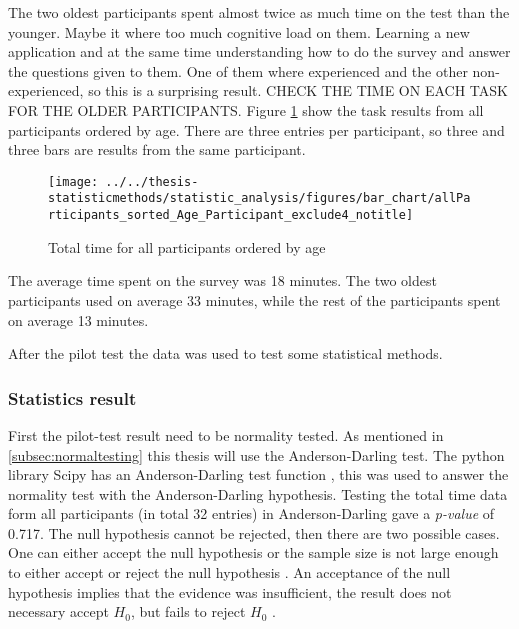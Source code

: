 The two oldest participants spent almost twice as much time on the test than the younger. Maybe it where too much cognitive load on them. Learning a new application and at the same time understanding how to do the survey and answer the questions given to them. One of them where experienced and the other non-experienced, so this is a surprising result.  CHECK THE TIME ON EACH TASK FOR THE OLDER PARTICIPANTS. Figure \ref{fig:allparticipantssortedageparticipantexclude4notitle} show the task results from all participants ordered by age. There are three entries per participant, so three and three bars are results from the same participant. 

\begin{figure}[h]
	\centering
	\texttt{[image: ../../thesis-statisticmethods/statistic\_analysis/figures/bar\_chart/allParticipants\_sorted\_Age\_Participant\_exclude4\_notitle]}
	\caption{Total time for all participants ordered by age}
	\label{fig:allparticipantssortedageparticipantexclude4notitle}
\end{figure}

The average time spent on the survey was 18 minutes. The two oldest participants used on average 33 minutes, while the rest of the participants spent on average 13 minutes. 

After the pilot test the data was used to test some statistical methods. 


\subsubsection{Statistics result}
First the pilot-test result need to be normality tested. 
As mentioned in \ref{subsec:normaltesting} this thesis will use the Anderson-Darling test. The python library Scipy has an Anderson-Darling test function \citep{TheScipycommunity2017}, this was used to answer the normality test with the Anderson-Darling hypothesis. Testing the total time data form all participants (in total 32 entries) in Anderson-Darling gave a \textit{p-value} of 0.717. The null hypothesis cannot be rejected, then there are two possible cases. One can either accept the null hypothesis or the sample size is not large enough to either accept or reject the null hypothesis \citep{ThePennsylvaniaStateUniversity2017}. An acceptance of the null hypothesis implies that the evidence was insufficient, the result does not necessary accept $H_{0}$, but fails to reject $H_{0}$ \citep{Walpole2012}.  

